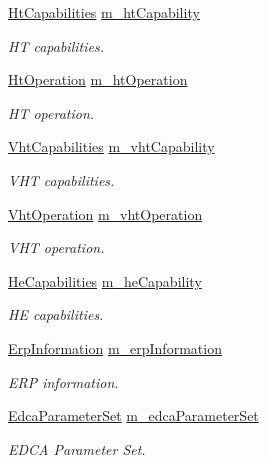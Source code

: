 \begin{DoxyCompactItemize}
\hyperlink{classns3_1_1HtCapabilities}{Ht\+Capabilities} \hyperlink{classns3_1_1MgtProbeResponseHeader_af236dbb4687cf8b04856a0ab4a27d302}{m\+\_\+ht\+Capability}
\begin{DoxyCompactList}\small\item\em HT capabilities. \end{DoxyCompactList}\item 
\hyperlink{classns3_1_1HtOperation}{Ht\+Operation} \hyperlink{classns3_1_1MgtProbeResponseHeader_a6c0dda761f105fbb764769aba8094b54}{m\+\_\+ht\+Operation}
\begin{DoxyCompactList}\small\item\em HT operation. \end{DoxyCompactList}\item 
\hyperlink{classns3_1_1VhtCapabilities}{Vht\+Capabilities} \hyperlink{classns3_1_1MgtProbeResponseHeader_a59bab09debd6d3ccb9a6df102a37a02d}{m\+\_\+vht\+Capability}
\begin{DoxyCompactList}\small\item\em V\+HT capabilities. \end{DoxyCompactList}\item 
\hyperlink{classns3_1_1VhtOperation}{Vht\+Operation} \hyperlink{classns3_1_1MgtProbeResponseHeader_a02d6b449ac57db6ce584a6a969258fde}{m\+\_\+vht\+Operation}
\begin{DoxyCompactList}\small\item\em V\+HT operation. \end{DoxyCompactList}\item 
\hyperlink{classns3_1_1HeCapabilities}{He\+Capabilities} \hyperlink{classns3_1_1MgtProbeResponseHeader_af832f02337e3affc1afdc8410018b1a8}{m\+\_\+he\+Capability}
\begin{DoxyCompactList}\small\item\em HE capabilities. \end{DoxyCompactList}\item 
\hyperlink{classns3_1_1ErpInformation}{Erp\+Information} \hyperlink{classns3_1_1MgtProbeResponseHeader_af9f812dcdf09e14f3c7b53c7faff4a63}{m\+\_\+erp\+Information}
\begin{DoxyCompactList}\small\item\em E\+RP information. \end{DoxyCompactList}\item 
\hyperlink{classns3_1_1EdcaParameterSet}{Edca\+Parameter\+Set} \hyperlink{classns3_1_1MgtProbeResponseHeader_ac99f7f16c321fa7594ef5354d3b4c750}{m\+\_\+edca\+Parameter\+Set}
\begin{DoxyCompactList}\small\item\em E\+D\+CA Parameter Set. \end{DoxyCompactList}\end{DoxyCompactItemize}
